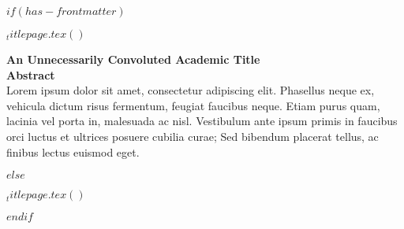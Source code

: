 $if(has-frontmatter)$
  \begin{frontmatter}
  \begin{titlepage}
  $_titlepage.tex()$
  
  \end{titlepage}
  
	\center %

  	{\huge\bfseries An Unnecessarily Convoluted Academic Title}\\[2cm] %

  	{\large\bfseries Abstract}\\[0.4cm] %

Lorem ipsum dolor sit amet, consectetur adipiscing elit. Phasellus neque ex, vehicula dictum risus fermentum, feugiat faucibus neque. Etiam purus quam, lacinia vel porta in, malesuada ac nisl. Vestibulum ante ipsum primis in faucibus orci luctus et ultrices posuere cubilia curae; Sed bibendum placerat tellus, ac finibus lectus euismod eget.
  
  \end{frontmatter}
$else$
  \begin{titlepage}
  $_titlepage.tex()$
  
  \end{titlepage}
$endif$

  

